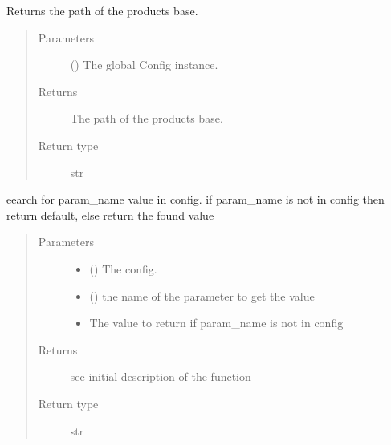 \documentclass[a4paper,10pt,english]{sphinxmanual}
\begin{document}
\begin{fulllineitems}
\label{\detokenize{commands/apidoc/src:src.get_base_path}}
Returns the path of the products base.
\begin{quote}\begin{description}
\item[{Parameters}] \leavevmode
{} () \textendash{} The global Config instance.

\item[{Returns}] \leavevmode
The path of the products base.

\item[{Return type}] \leavevmode
str

\end{description}\end{quote}

\end{fulllineitems}


\begin{fulllineitems}
\label{\detokenize{commands/apidoc/src:src.get_cfg_param}}
eearch for param\_name value in config.
if param\_name is not in config 
then return default,
else return the found value
\begin{quote}\begin{description}
\item[{Parameters}] \leavevmode\begin{itemize}
\item {} 
 () \textendash{} The config.

\item {} 
 () \textendash{} the name of the parameter to get the value

\item {} 
 \textendash{} The value to return if param\_name is not in config

\end{itemize}

\item[{Returns}] \leavevmode
see initial description of the function

\item[{Return type}] \leavevmode
str

\end{description}\end{quote}

\end{fulllineitems}
\end{document}
